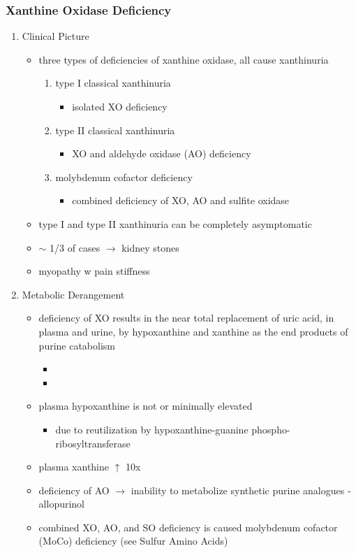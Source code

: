 \documentclass{scrartcl}
\begin{document}
\subsubsection{Xanthine Oxidase Deficiency}
\label{sec:orge67c9d6}
\begin{enumerate}
\item Clinical Picture
\label{sec:orgd5e6e3e}
\begin{itemize}
\item three types of deficiencies of xanthine oxidase, all cause
xanthinuria
\begin{enumerate}
\item type I classical xanthinuria
\begin{itemize}
\item isolated XO deficiency
\end{itemize}
\item type II classical xanthinuria
\begin{itemize}
\item XO and aldehyde oxidase (AO) deficiency
\end{itemize}
\item molybdenum cofactor deficiency
\begin{itemize}
\item combined deficiency of XO, AO and sulfite oxidase
\end{itemize}
\end{enumerate}
\item type I and type II xanthinuria can be completely asymptomatic
\item \(\sim\) 1/3 of cases \(\to\) kidney stones
\item myopathy w pain stiffness
\end{itemize}

\item Metabolic Derangement
\label{sec:orgfc176d8}
\begin{itemize}
\item deficiency of XO results in the near total replacement of uric acid,
in plasma and urine, by hypoxanthine and xanthine as the end
products of purine catabolism
\begin{itemize}
\item {}
\item {}
\end{itemize}
\item plasma hypoxanthine is not or minimally elevated
\begin{itemize}
\item due to reutilization by hypoxanthine-guanine phospho-ribosyltransferase
\end{itemize}
\item plasma xanthine \(\uparrow\) 10x
\item deficiency of AO \(\to\) inability to metabolize synthetic purine
analogues - allopurinol
\item combined XO, AO, and SO deficiency is caused molybdenum cofactor
(MoCo) deficiency (see Sulfur Amino Acids)
\end{itemize}


\end{enumerate}
\end{document}
